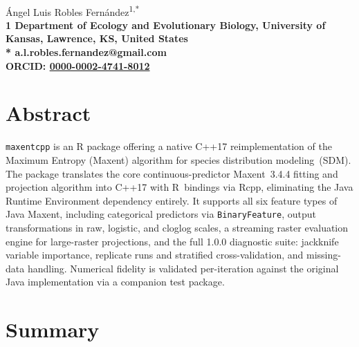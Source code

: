 \documentclass[10pt,letterpaper]{article}
\begin{document}
\vspace*{0.35in}

\begin{flushleft}
{\Large
\textbf{}
}
\newline
\\
\'Angel Luis Robles Fern\'andez\textsuperscript{1,*}
\\
\bigskip
\bf{1} Department of Ecology and Evolutionary Biology, University of Kansas, Lawrence, KS, United States
\\
\bigskip
* a.l.robles.fernandez@gmail.com
\\
ORCID: \href{https://orcid.org/0000-0002-4741-8012}{0000-0002-4741-8012}

\end{flushleft}

\section*{Abstract}

\texttt{maxentcpp} is an R package offering a native C++17
reimplementation of the Maximum Entropy (Maxent) algorithm for species
distribution modeling~(SDM). The package translates the core
continuous-predictor Maxent~3.4.4 fitting and projection algorithm into
C++17 with R~bindings via Rcpp, eliminating the Java Runtime Environment
dependency entirely. It supports all six feature types of Java Maxent,
including categorical predictors via \texttt{BinaryFeature}, output
transformations in raw, logistic, and cloglog scales, a streaming raster
evaluation engine for large-raster projections, and the full 1.0.0
diagnostic suite: jackknife variable importance, replicate runs and
stratified cross-validation, and missing-data handling. Numerical
fidelity is validated per-iteration against the original Java
implementation via a companion test package.

\linenumbers

\section*{Summary}
\end{document}
